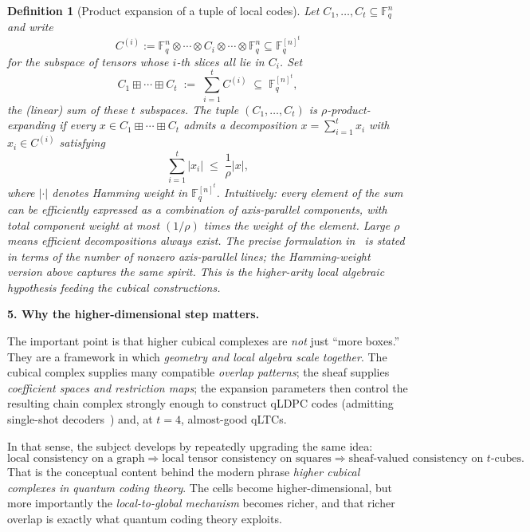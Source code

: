 \documentclass[10pt]{article}
\theoremstyle{compactdef}
\newtheorem{definition}{Definition}
\begin{document}
\begin{definition}[Product expansion of a tuple of local codes]
Let $C_1,\dots,C_t\subseteq \mathbb F_q^n$ and write
\[
C^{(i)}:=\mathbb F_q^n\otimes\cdots\otimes C_i\otimes\cdots\otimes \mathbb F_q^n\subseteq \mathbb F_q^{[n]^t}
\]
for the subspace of tensors whose $i$-th slices all lie in $C_i$. Set
\[
C_1\boxplus\cdots\boxplus C_t \;:=\; \sum_{i=1}^t C^{(i)} \;\subseteq\; \mathbb F_q^{[n]^t},
\]
the (linear) sum of these $t$ subspaces. The tuple $(C_1,\dots,C_t)$ is \emph{$\rho$-product-expanding} if every $x\in C_1\boxplus\cdots\boxplus C_t$ admits a decomposition $x=\sum_{i=1}^t x_i$ with $x_i\in C^{(i)}$ satisfying
\[
\sum_{i=1}^t |x_i| \;\le\; \frac{1}{\rho}|x|,
\]
where $|\cdot|$ denotes Hamming weight in $\mathbb F_q^{[n]^t}$. Intuitively: every element of the sum can be efficiently expressed as a combination of axis-parallel components, with total component weight at most $(1/\rho)$ times the weight of the element. Large $\rho$ means efficient decompositions always exist. The precise formulation in~\cite{PKprod} is stated in terms of the number of nonzero axis-parallel lines; the Hamming-weight version above captures the same spirit. This is the higher-arity \emph{local algebraic hypothesis} feeding the cubical constructions.~\cite{PKprod}
\end{definition}

\textbf{5. Why the higher-dimensional step matters.}

The important point is that higher cubical complexes are \emph{not} just ``more boxes.'' They are a framework in which \emph{geometry and local algebra scale together}. The cubical complex supplies many compatible \emph{overlap patterns}; the sheaf supplies \emph{coefficient spaces and restriction maps}; the expansion parameters then control the resulting chain complex strongly enough to construct qLDPC codes (admitting single-shot decoders~\cite{GLZ}) and, at $t=4$, almost-good qLTCs.~\cite{DLV}

In that sense, the subject develops by repeatedly upgrading the same idea:
\[
\text{local consistency on a graph}
\Longrightarrow
\text{local tensor consistency on squares}
\Longrightarrow
\text{sheaf-valued consistency on }t\text{-cubes}.
\]
That is the conceptual content behind the modern phrase \emph{higher cubical complexes in quantum coding theory}. The cells become higher-dimensional, but more importantly the \emph{local-to-global mechanism} becomes richer, and that richer overlap is exactly what quantum coding theory exploits.
\end{document}
